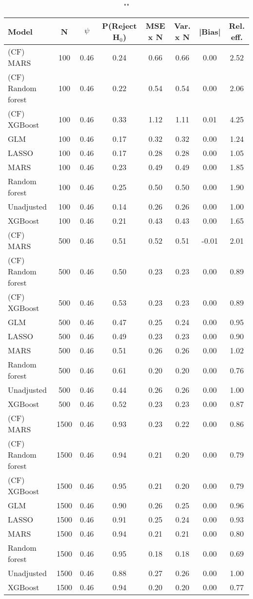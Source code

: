 \begin{table}
\centering
\caption{""}
\begin{tabular}{lccccccc}
\toprule
Model & N & $\psi$ & P(Reject H$_0$) & MSE x N & Var. x N & |Bias| & Rel. eff.\\ \midrule
(CF) MARS & 100 & 0.46 & 0.24 & 0.66 & 0.66 &  0.00 & 2.52 \\ 
(CF) Random forest & 100 & 0.46 & 0.22 & 0.54 & 0.54 &  0.00 & 2.06 \\ 
(CF) XGBoost & 100 & 0.46 & 0.33 & 1.12 & 1.11 &  0.01 & 4.25 \\ 
GLM & 100 & 0.46 & 0.17 & 0.32 & 0.32 &  0.00 & 1.24 \\ 
LASSO & 100 & 0.46 & 0.17 & 0.28 & 0.28 &  0.00 & 1.05 \\ 
MARS & 100 & 0.46 & 0.23 & 0.49 & 0.49 &  0.00 & 1.85 \\ 
Random forest & 100 & 0.46 & 0.25 & 0.50 & 0.50 &  0.00 & 1.90 \\ 
Unadjusted & 100 & 0.46 & 0.14 & 0.26 & 0.26 &  0.00 & 1.00 \\ 
XGBoost & 100 & 0.46 & 0.21 & 0.43 & 0.43 &  0.00 & 1.65 \\ \addlinespace 
(CF) MARS & 500 & 0.46 & 0.51 & 0.52 & 0.51 & -0.01 & 2.01 \\ 
(CF) Random forest & 500 & 0.46 & 0.50 & 0.23 & 0.23 &  0.00 & 0.89 \\ 
(CF) XGBoost & 500 & 0.46 & 0.53 & 0.23 & 0.23 &  0.00 & 0.89 \\ 
GLM & 500 & 0.46 & 0.47 & 0.25 & 0.24 &  0.00 & 0.95 \\ 
LASSO & 500 & 0.46 & 0.49 & 0.23 & 0.23 &  0.00 & 0.90 \\ 
MARS & 500 & 0.46 & 0.51 & 0.26 & 0.26 &  0.00 & 1.02 \\ 
Random forest & 500 & 0.46 & 0.61 & 0.20 & 0.20 &  0.00 & 0.76 \\ 
Unadjusted & 500 & 0.46 & 0.44 & 0.26 & 0.26 &  0.00 & 1.00 \\ 
XGBoost & 500 & 0.46 & 0.52 & 0.23 & 0.23 &  0.00 & 0.87 \\ \addlinespace 
(CF) MARS & 1500 & 0.46 & 0.93 & 0.23 & 0.22 &  0.00 & 0.86 \\ 
(CF) Random forest & 1500 & 0.46 & 0.94 & 0.21 & 0.20 &  0.00 & 0.79 \\ 
(CF) XGBoost & 1500 & 0.46 & 0.95 & 0.21 & 0.20 &  0.00 & 0.79 \\ 
GLM & 1500 & 0.46 & 0.90 & 0.26 & 0.25 &  0.00 & 0.96 \\ 
LASSO & 1500 & 0.46 & 0.91 & 0.25 & 0.24 &  0.00 & 0.93 \\ 
MARS & 1500 & 0.46 & 0.94 & 0.21 & 0.21 &  0.00 & 0.80 \\ 
Random forest & 1500 & 0.46 & 0.95 & 0.18 & 0.18 &  0.00 & 0.69 \\ 
Unadjusted & 1500 & 0.46 & 0.88 & 0.27 & 0.26 &  0.00 & 1.00 \\ 
XGBoost & 1500 & 0.46 & 0.94 & 0.20 & 0.20 &  0.00 & 0.77 \\
\bottomrule
\end{tabular}
\end{table}

